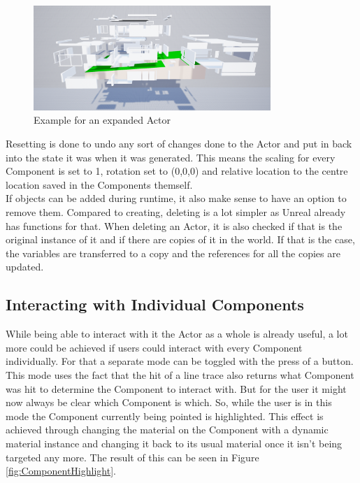\begin{figure}[htpb]
	\centering
	\includegraphics[width=0.8\textwidth]{fig/ExpanedActor.png}
	\caption[Example for an expanded Actor]{Example for an expanded Actor\protect}
	\label{fig:ExpanedActor}
\end{figure}

Resetting is done to undo any sort of changes done to the Actor and put in back into the state it was when it was generated. This means the scaling for every Component is set to 1, rotation set to (0,0,0) and relative location to the centre location saved in the Components themself.\\
If objects can be added during runtime, it also make sense to have an option to remove them. Compared to creating, deleting is a lot simpler as Unreal already has functions for that. When deleting an Actor, it is also checked if that is the original instance of it and if there are copies of it in the world. If that is the case, the variables are transferred to a copy and the references for all the copies are updated.\\

\subsection{Interacting with Individual Components}

While being able to interact with it the Actor as a whole is already useful, a lot more could be achieved if users could interact with every Component individually. For that a separate mode can be toggled with the press of a button. This mode uses the fact that the hit of a line trace also returns what Component was hit to determine the Component to interact with. But for the user it might now always be clear which Component is which. So, while the user is in this mode the Component currently being pointed is highlighted. This effect is achieved through changing the material on the Component with a dynamic material instance and changing it back to its usual material once it isn't being targeted any more. The result of this can be seen in Figure \ref{fig:ComponentHighlight}.\\

